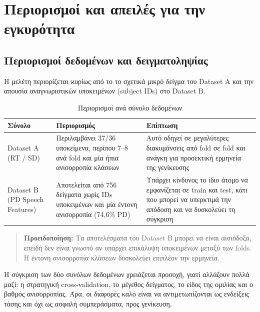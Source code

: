
\chapter{Περιορισμοί και απειλές για την εγκυρότητα}
\label{ch:limitations}

\section{Περιορισμοί δεδομένων και δειγματοληψίας}

Η μελέτη περιορίζεται ϰυρίως από το το σχετικά μικρό δείγμα του Dataset A και την απουσία αναγνωριστικών υποκειμένων (subject IDs) στο Dataset B.

\begin{table}[H]
    \centering
    \caption{Περιορισμοί ανά σύνολο δεδομένων}
    \label{tab:data-limitations-summary}
    \begin{tabular}{@{}p{2.4cm}p{4.6cm}p{6cm}@{}}
        \toprule
        \textbf{Σύνολο} & \textbf{Περιορισμός} & \textbf{Επίπτωση} \\
        \midrule
        Dataset A (RT / SD) & Περιλαμβάνει 37/36 υποκείμενα, περίπου 7--8 ανά fold και μία ήπια ανισορροπία κλάσεων & Αυτό οδηγεί σε μεγαλύτερες διακυμάνσεις από fold σε fold και ανάγκη για προσεκτική ερμηνεία της γενίκευσης \\
        Dataset B (PD Speech Features) & Αποτελείται από 756 δείγματα χωρίς IDs υποκειμένων και μία έντονη ανισορροπία (74{,}6\% PD) & Υπάρχει κίνδυνος το ίδιο άτομο να εμφανίζεται σε train και test, κάτι που μπορεί να υπερκτιμά την απόδοση και να δυσκολεύει τη σύγκριση \\
        \bottomrule
    \end{tabular}
\end{table}

\begin{quote}
    \label{cav:dataset-b-leakage}
    \textbf{Προειδοποίηση:} Τα αποτελέσματα του Dataset B μπορεί να είναι αισιόδοξα, επειδή δεν είναι γνωστό αν υπάρχει επικάλυψη υποκειμένων μεταξύ των folds. Η έντονη ανισορροπία κλάσεων δυσκολεύει επιπλέον την ερμηνεία.
\end{quote}

Η σύγκριση των δύο συνόλων δεδομένων χρειάζεται προσοχή, 
γιατί αλλάζουν πολλά μαζί: η στρατηγική cross-validation, το μέγεθος δείγματος, το είδος της ομιλίας και ο βαθμός ανισορροπίας. 
Άρα, οι διαφορές καλό είναι να αντιμετωπίζονται ως ενδείξεις τάσης και όχι ως ασφαλή συμπεράσματα, προς γενίκευση.

